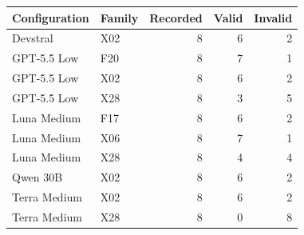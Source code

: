 \begin{tabular}{llrrr}
\toprule
Configuration & Family & Recorded & Valid & Invalid\\
\midrule
Devstral & X02 & 8 & 6 & 2\\
GPT-5.5 Low & F20 & 8 & 7 & 1\\
GPT-5.5 Low & X02 & 8 & 6 & 2\\
GPT-5.5 Low & X28 & 8 & 3 & 5\\
Luna Medium & F17 & 8 & 6 & 2\\
Luna Medium & X06 & 8 & 7 & 1\\
Luna Medium & X28 & 8 & 4 & 4\\
Qwen 30B & X02 & 8 & 6 & 2\\
Terra Medium & X02 & 8 & 6 & 2\\
Terra Medium & X28 & 8 & 0 & 8\\
\bottomrule
\end{tabular}
